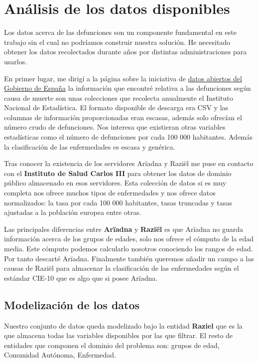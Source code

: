 \chapter{Análisis de los datos disponibles}

Los datos acerca de las defunciones son un componente fundamental en este trabajo sin
el cual no podríamos construir nuestra solución. He necesitado obtener los datos recolectados
durante años por distintas administraciones para usarlos.

En primer lugar, me dirigí a la página sobre la iniciativa de \href{https://datos.gob.es/}{datos abiertos del Gobierno de España}
la información que encontré relativa a las defunciones
según causa de muerte son unas colecciones que recolecta anualmente el Instituto
Nacional de Estadística. El formato disponible de descarga era CSV y las columnas de información
proporcionadas eran escasas, además solo ofrecían el número crudo de defunciones. Nos interesa que existieran
otras variables estadísticas como el número de defunciones por cada 100 000 habitantes. Además la clasificación de
las enfermedades es escasa y genérica.

Tras conocer la existencia de los servidores Arïadna y Raziël me puse en contacto con el \textbf{Instituto de Salud Carlos
III} para obtener los datos de dominio público almacenado en esos servidores. Esta colección de datos si es muy completa
nos ofrece muchos tipos de enfermedades y nos ofrece datos normalizados: la tasa por cada 100 000 habitantes, tasas truncadas y
tasas ajustadas a la población europea entre otras.

Las principales diferencias entre \textbf{Arïadna} y \textbf{Raziël} es que Arïadna no guarda información acerca
de los grupos de edades, solo nos ofrece el cómputo de la edad media. Este cómputo podemos calcularlo nosotros conociendo
los rangos de edad. Por tanto descarté Arïadna.
Finalmente también queremos añadir un campo a las causas de Raziël para almacenar la clasificación de las
enfermedades según el estándar \gls{CIE-10} que es algo que si posee Arïadna.

\section{Modelización de los datos}
Nuestro conjunto de datos queda modelizado bajo la entidad \textbf{Raziel} que es la que almacena todas las variables
disponibles por las que filtrar. El resto de entidades que componen el dominio del problema son: grupos de edad,
Comunidad Autónoma, Enfermedad.
